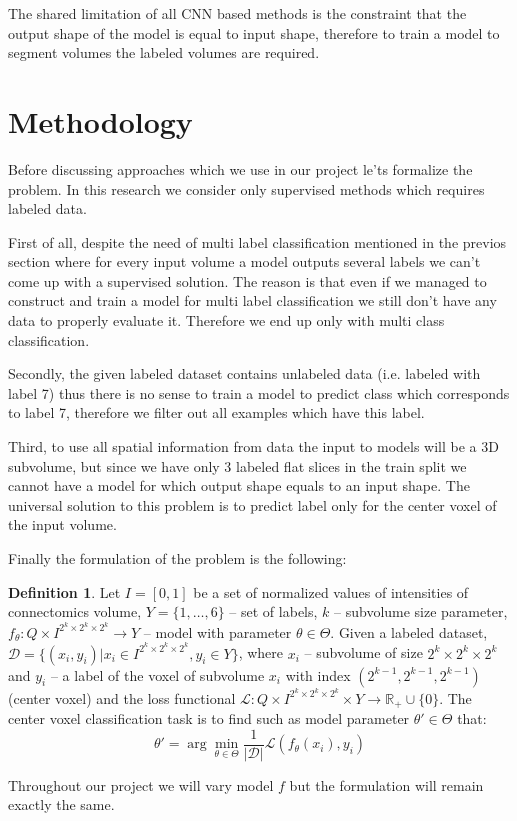 \documentclass[twocolumn, a4paper]{article}
\theoremstyle{definition}
\newtheorem{definition}{Definition}
\begin{document}
The shared limitation of all CNN based methods is the constraint that the output shape of the model
is equal to input shape, therefore to train a model to segment volumes the labeled volumes are required.

\section{Methodology}
Before discussing approaches which we use in our project le'ts formalize the problem. In this
research we consider only supervised methods which requires labeled data.

First of all, despite the need of multi label classification mentioned in the previos section
where for every input volume a model outputs several labels we can't come up with a
supervised solution. The reason is that even if we managed to construct and train a model for multi label
classification we still don't have any data to properly evaluate it. Therefore we end up only with multi class classification.

Secondly, the given labeled dataset contains unlabeled data (i.e. labeled with label 7) thus
there is no sense to train a model to predict class which corresponds to label 7, therefore we filter
out all examples which have this label.

Third, to use all spatial information from data the input to models will be a 3D subvolume,
but since we have only 3 labeled flat slices in the train split we cannot have a model for which
output shape equals to an input shape. The universal solution to this problem is to predict label
only for the center voxel of the input volume.

Finally the formulation of the problem is the following:
\begin{definition}
    Let \( I = [0, 1] \) be a set of normalized values
    of intensities of connectomics volume, \( Y = \{ 1, \dots, 6 \} \) -- set of labels,
    \( k \) -- subvolume size parameter, \(f_{\theta}: Q \times I^{2^k \times 2^k \times 2^k} \to Y \) -- model
    with parameter \( \theta \in \Theta \).
    Given a labeled dataset,
    \(\mathcal{D} = \{ (x_i, y_i) | x_i \in I^{2^k \times 2^k \times 2^k}, y_i \in Y \}\),
    where \( x_i \) -- subvolume of size \( 2^k \times 2^k \times 2^k \) and
    \( y_i \) -- a label of the voxel of subvolume
    \( x_i \) with index \( (2^{k-1},2^{k-1},2^{k-1}) \) (center voxel) and the loss functional
    \( \mathcal{L}: Q \times I^{2^k \times 2^k \times 2^k} \times Y \to \mathbb{R}_+ \cup \{ 0 \} \).
    The center voxel classification task is to find such as model parameter \( \theta' \in \Theta \) that:
    \begin{equation*}
        \theta' = \arg \min\limits_{\theta \in \Theta} \frac{1}{|\mathcal{D}|} \mathcal{L}(f_{\theta}(x_i), y_i)
    \end{equation*}
\end{definition}
Throughout our project we will vary model \( f \) but the formulation will remain exactly the same.
\end{document}
